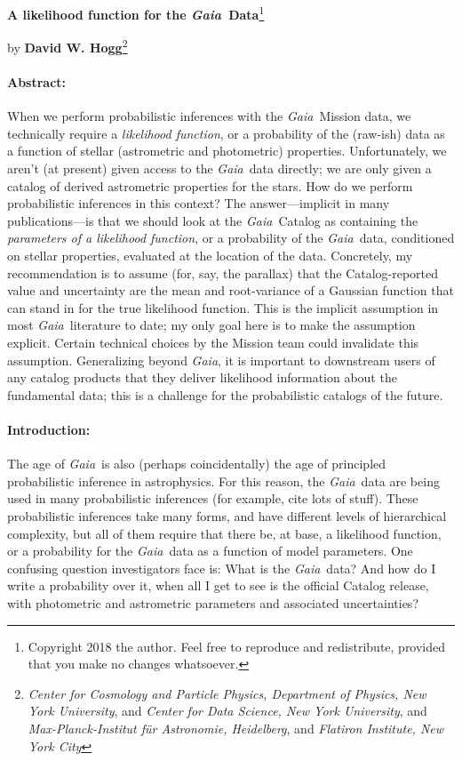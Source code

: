 \documentclass[12pt]{article}
\newcommand{\Gaia}{\textsl{Gaia}}
\begin{document}
\sloppy\sloppypar\raggedbottom\frenchspacing

\noindent
\textbf{A likelihood function for the \Gaia\ Data}\footnote{%
  Copyright 2018 the author. Feel free to reproduce and redistribute, provided
  that you make no changes whatsoever.}
\bigskip

\noindent
by \textbf{David W. Hogg}\footnote{%
\textsl{Center for Cosmology and Particle Physics, Department of Physics, New York University}, and
\textsl{Center for Data Science, New York University}, and
\textsl{Max-Planck-Institut f\"ur Astronomie, Heidelberg}, and
\textsl{Flatiron Institute, New York City}}

\paragraph{Abstract:}
When we perform probabilistic inferences with the \Gaia\ Mission data,
we technically require
a \emph{likelihood function}, or a probability of the (raw-ish) data as a function
of stellar (astrometric and photometric) properties.
Unfortunately, we aren't (at present) given access to the \Gaia\ data
directly;
we are only given a catalog of derived astrometric properties for the stars.
How do we perform probabilistic inferences in this context?
The answer---implicit in many publications---is that we should look at the
\Gaia\ Catalog as containing the \emph{parameters of a likelihood function}, or
a probability of the \Gaia\ data, conditioned on stellar properties,
evaluated at the location of the data.
Concretely, my recommendation is to assume
(for, say, the parallax) that the Catalog-reported
value and uncertainty are the mean and root-variance of a Gaussian
function that can stand in for the true likelihood function.
This is the implicit assumption in most \Gaia\ literature to date;
my only goal here is to make the assumption explicit.
Certain technical choices by the Mission team could invalidate
this assumption. Generalizing beyond \Gaia,
it is important to downstream users of any catalog products
that they deliver likelihood information about the fundamental data;
this is a challenge for the probabilistic catalogs of the future.

\paragraph{Introduction:}
The age of \Gaia\ is also (perhaps coincidentally) the age of principled
probabilistic inference in astrophysics.
For this reason, the \Gaia\ data are being used in many probabilistic
inferences (for example, cite lots of stuff).
These probabilistic inferences take many forms, and have different levels
of hierarchical complexity, but all of them require that there be, at base,
a likelihood function, or a probability for the \Gaia\ data as a function
of model parameters.
One confusing question investigators face is: What is the \Gaia\ data?
And how do I write a probability over it, when all I get to see is the
official Catalog release, with photometric and astrometric parameters and associated
uncertainties?
\end{document}
